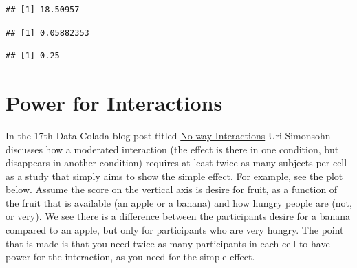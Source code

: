 \documentclass[]{book}
\newenvironment{Shaded}{\begin{snugshade}}{\end{snugshade}}
\newcommand{\CommentTok}[1]{\textcolor[rgb]{0.56,0.35,0.01}{\textit{#1}}}
\newcommand{\DecValTok}[1]{\textcolor[rgb]{0.00,0.00,0.81}{#1}}
\newcommand{\KeywordTok}[1]{\textcolor[rgb]{0.13,0.29,0.53}{\textbf{#1}}}
\newcommand{\NormalTok}[1]{#1}
\newcommand{\OperatorTok}[1]{\textcolor[rgb]{0.81,0.36,0.00}{\textbf{#1}}}
\newcommand{\StringTok}[1]{\textcolor[rgb]{0.31,0.60,0.02}{#1}}
\begin{document}
\begin{Shaded}
\end{Shaded}

\begin{verbatim}
## [1] 18.50957
\end{verbatim}

\begin{Shaded}
\end{Shaded}

\begin{verbatim}
## [1] 0.05882353
\end{verbatim}

\begin{Shaded}
\end{Shaded}

\begin{verbatim}
## [1] 0.25
\end{verbatim}

\hypertarget{power-for-interactions}{%
\chapter{Power for Interactions}\label{power-for-interactions}}

In the 17th Data Colada blog post titled \href{http://datacolada.org/17}{No-way Interactions} Uri Simonsohn discusses how a moderated interaction (the effect is there in one condition, but disappears in another condition) requires at least twice as many subjects per cell as a study that simply aims to show the simple effect. For example, see the plot below. Assume the score on the vertical axis is desire for fruit, as a function of the fruit that is available (an apple or a banana) and how hungry people are (not, or very). We see there is a difference between the participants desire for a banana compared to an apple, but only for participants who are very hungry. The point that is made is that you need twice as many participants in each cell to have power for the interaction, as you need for the simple effect.
\end{document}

